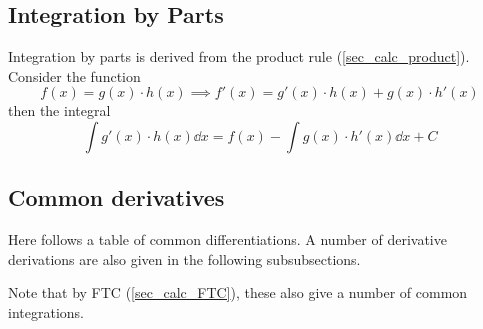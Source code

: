 \documentclass[fleqn,a4paper,11pt]{article}
\begin{document}
    \subsection{Integration by Parts}

    Integration by parts is derived from the product rule
    (\ref{sec_calc_product}).  Consider the function
    \begin{equation*}
    f(x) = g(x) \cdot h(x) \implies f'(x) = g'(x) \cdot h(x) + g(x) \cdot h'(x)
    \end{equation*}
    then the integral
    \begin{equation}
    \int g'(x) \cdot h(x) \dd{x} = f(x) - \int g(x) \cdot h'(x) \dd{x} + C
    \end{equation}

    \subsection{Common derivatives} \label{calc_common}


    Here follows a table of common differentiations. A number of derivative
    derivations are also given in the following subsubsections.

    Note that by FTC (\ref{sec_calc_FTC}), these also give a number of common
    integrations.
\end{document}
